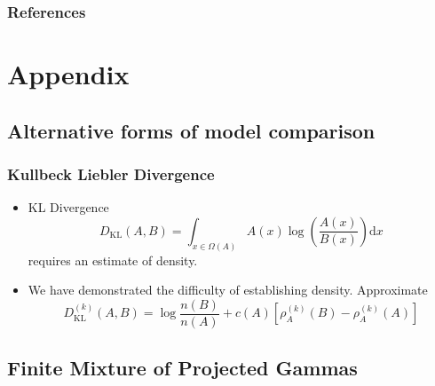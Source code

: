 \documentclass[aspectratio=169]{beamer}
\begin{document}
\begin{frame}
    \frametitle{References}
    
\end{frame}


\appendix

\section*{Appendix}

\subsection*{Alternative forms of model comparison}
\begin{frame}
  \frametitle{Kullbeck Liebler Divergence}
  \begin{itemize}
    \item KL Divergence
      \begin{equation*}
        D_{\text{KL}}(A,B) = \int_{x\in \Omega(A)}A(x)\log\left(\frac{A(x)}{B(x)}\right)\text{d}x
      \end{equation*}
      requires an estimate of density.
    \pause
    \item We have demonstrated the difficulty of establishing density.  Approximate
      \begin{equation*}
      D_{\text{KL}}^{(k)}(A,B) = \log\frac{n(B)}{n(A)} + c(A) \left[\rho_A^{(k)}(B)
                                                      - \rho_A^{(k)}(A)\right]
      \end{equation*}
  \end{itemize}
\end{frame} %

\subsection*{Finite Mixture of Projected Gammas}
\end{document}
